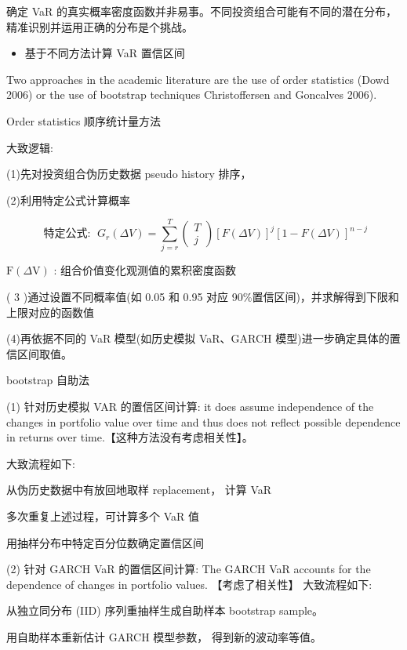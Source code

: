  确定 VaR 的真实概率密度函数并非易事。不同投资组合可能有不同的潜在分布， 精准识别并运用正确的分布是个挑战。

\begin{itemize}
\item 基于不同方法计算 VaR 置信区间
\end{itemize}

 Two approaches in the academic literature are the use of order statistics (Dowd 2006) or the use of bootstrap techniques Christoffersen and Goncalves 2006).

 Order statistics 顺序统计量方法

大致逻辑:

(1)先对投资组合伪历史数据 pseudo history 排序，

(2)利用特定公式计算概率

\[
\text{ 特定公式: }\;{G}_{r}\left( {\Delta V}\right)  = \mathop{\sum }\limits_{{j = r}}^{T}\left( \begin{matrix} T \\  j \end{matrix}\right) {\left\lbrack  F\left( \Delta V\right) \right\rbrack  }^{j}{\left\lbrack  1 - F\left( \Delta V\right) \right\rbrack  }^{n - j}
\]

\(\mathrm{F}\left( {\Delta \mathrm{V}}\right)\) : 组合价值变化观测值的累积密度函数

( 3 )通过设置不同概率值(如 0.05 和 0.95 对应 90\%置信区间)，并求解得到下限和上限对应的函数值

(4)再依据不同的 VaR 模型(如历史模拟 VaR、GARCH 模型)进一步确定具体的置信区间取值。

bootstrap 自助法

(1) 针对历史模拟 VAR 的置信区间计算: it does assume independence of the changes in portfolio value over time and thus does not reflect possible dependence in returns over time.【这种方法没有考虑相关性】。

大致流程如下:

从伪历史数据中有放回地取样 replacement， 计算 VaR

多次重复上述过程，可计算多个 VaR 值

用抽样分布中特定百分位数确定置信区间

(2) 针对 GARCH VaR 的置信区间计算: The GARCH VaR accounts for the dependence of changes in portfolio values. 【考虑了相关性】 大致流程如下:

从独立同分布 (IID) 序列重抽样生成自助样本 bootstrap sample。

用自助样本重新估计 GARCH 模型参数， 得到新的波动率等值。

